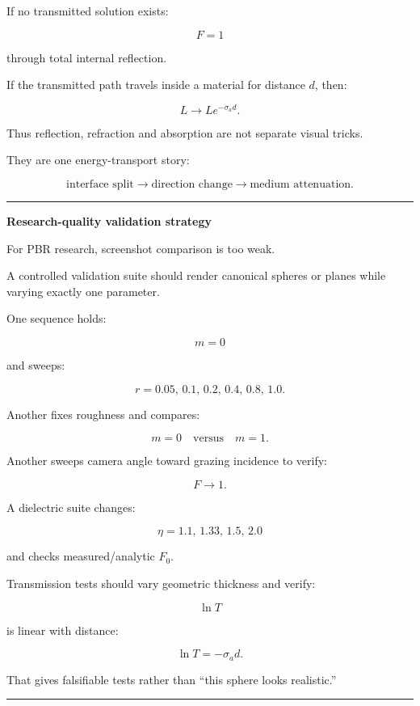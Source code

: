 If no transmitted solution exists:

\[
F=1
\]

through total internal reflection.

If the transmitted path travels inside a material for distance \(d\), then:

\[
L\rightarrow
L
e^{-\sigma_a d}.
\]

Thus reflection, refraction and absorption are not separate visual tricks.

They are one energy-transport story:

\[
\boxed{
\text{interface split}
\rightarrow
\text{direction change}
\rightarrow
\text{medium attenuation}.
}
\]

\begin{center}\rule{0.5\linewidth}{0.5pt}\end{center}

\textbf{Research-quality validation strategy}

For PBR research, screenshot comparison is too weak.

A controlled validation suite should render canonical spheres or planes while varying exactly one parameter.

One sequence holds:

\[
m=0
\]

and sweeps:

\[
r=
0.05,\,
0.1,\,
0.2,\,
0.4,\,
0.8,\,
1.0.
\]

Another fixes roughness and compares:

\[
m=0
\quad\text{versus}\quad
m=1.
\]

Another sweeps camera angle toward grazing incidence to verify:

\[
F\rightarrow1.
\]

A dielectric suite changes:

\[
\eta=
1.1,\,
1.33,\,
1.5,\,
2.0
\]

and checks measured/analytic \(F_0\).

Transmission tests should vary geometric thickness and verify:

\[
\ln T
\]

is linear with distance:

\[
\ln T=-\sigma_a d.
\]

That gives falsifiable tests rather than ``this sphere looks realistic.''

\begin{center}\rule{0.5\linewidth}{0.5pt}\end{center}

